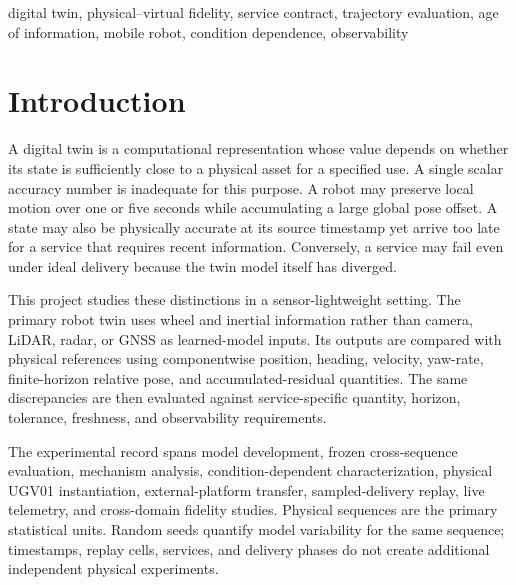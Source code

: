 \documentclass[journal,onecolumn]{IEEEtran}
\begin{document}
\begin{abstract}
\end{abstract}

\begin{IEEEkeywords}
digital twin, physical--virtual fidelity, service contract, trajectory evaluation, age of information, mobile robot, condition dependence, observability
\end{IEEEkeywords}

\section{Introduction}
A digital twin is a computational representation whose value depends on whether its state is sufficiently close to a physical asset for a specified use. A single scalar accuracy number is inadequate for this purpose. A robot may preserve local motion over one or five seconds while accumulating a large global pose offset. A state may also be physically accurate at its source timestamp yet arrive too late for a service that requires recent information. Conversely, a service may fail even under ideal delivery because the twin model itself has diverged.

This project studies these distinctions in a sensor-lightweight setting. The primary robot twin uses wheel and inertial information rather than camera, LiDAR, radar, or GNSS as learned-model inputs. Its outputs are compared with physical references using componentwise position, heading, velocity, yaw-rate, finite-horizon relative pose, and accumulated-residual quantities. The same discrepancies are then evaluated against service-specific quantity, horizon, tolerance, freshness, and observability requirements.

The experimental record spans model development, frozen cross-sequence evaluation, mechanism analysis, condition-dependent characterization, physical UGV01 instantiation, external-platform transfer, sampled-delivery replay, live telemetry, and cross-domain fidelity studies. Physical sequences are the primary statistical units. Random seeds quantify model variability for the same sequence; timestamps, replay cells, services, and delivery phases do not create additional independent physical experiments.
\end{document}
